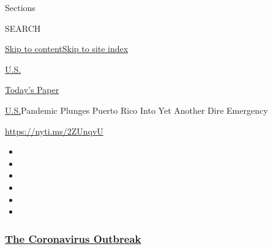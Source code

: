 Sections

SEARCH

\protect\hyperlink{site-content}{Skip to
content}\protect\hyperlink{site-index}{Skip to site index}

\href{https://www.nytimes3xbfgragh.onion/section/us}{U.S.}

\href{https://myaccount.nytimes3xbfgragh.onion/auth/login?response_type=cookie\&client_id=vi}{}

\href{https://www.nytimes3xbfgragh.onion/section/todayspaper}{Today's
Paper}

\href{/section/us}{U.S.}\textbar{}Pandemic Plunges Puerto Rico Into Yet
Another Dire Emergency

\url{https://nyti.ms/2ZUnqvU}

\begin{itemize}
\item
\item
\item
\item
\item
\item
\end{itemize}

\hypertarget{the-coronavirus-outbreak}{%
\subsubsection{\texorpdfstring{\href{https://www.nytimes3xbfgragh.onion/news-event/coronavirus?name=styln-coronavirus-national\&region=TOP_BANNER\&variant=undefined\&block=storyline_menu_recirc\&action=click\&pgtype=Article\&impression_id=3f940c70-e399-11ea-8313-f9307944f60a}{The
Coronavirus
Outbreak}}{The Coronavirus Outbreak}}\label{the-coronavirus-outbreak}}


